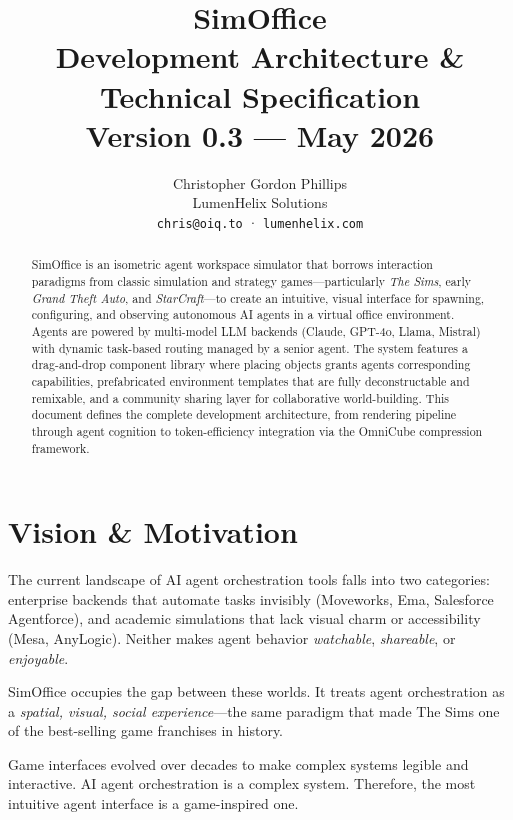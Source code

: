 \documentclass[11pt,letterpaper]{article}
\title{
  \vspace{-1cm}
  {\Huge\bfseries\textcolor{accent}{SimOffice}}\\[6pt]
  {\Large Development Architecture \& Technical Specification}\\[12pt]
  {\normalsize Version 0.3 --- May 2026}
}
\author{
  Christopher Gordon Phillips\\
  {\small LumenHelix Solutions}\\
  {\small\texttt{chris@oiq.to} · \texttt{lumenhelix.com}}
}
\date{}
\begin{document}
\maketitle
\thispagestyle{fancy}

\begin{abstract}
\noindent
SimOffice is an isometric agent workspace simulator that borrows interaction paradigms from classic simulation and strategy games---particularly \emph{The Sims}, early \emph{Grand Theft Auto}, and \emph{StarCraft}---to create an intuitive, visual interface for spawning, configuring, and observing autonomous AI agents in a virtual office environment. Agents are powered by multi-model LLM backends (Claude, GPT-4o, Llama, Mistral) with dynamic task-based routing managed by a senior agent. The system features a drag-and-drop component library where placing objects grants agents corresponding capabilities, prefabricated environment templates that are fully deconstructable and remixable, and a community sharing layer for collaborative world-building. This document defines the complete development architecture, from rendering pipeline through agent cognition to token-efficiency integration via the OmniCube compression framework.
\end{abstract}

\tableofcontents
\newpage

\section{Vision \& Motivation}

The current landscape of AI agent orchestration tools falls into two categories: enterprise backends that automate tasks invisibly (Moveworks, Ema, Salesforce Agentforce), and academic simulations that lack visual charm or accessibility (Mesa, AnyLogic). Neither makes agent behavior \emph{watchable}, \emph{shareable}, or \emph{enjoyable}.

SimOffice occupies the gap between these worlds. It treats agent orchestration as a \emph{spatial, visual, social experience}---the same paradigm that made The Sims one of the best-selling game franchises in history.

\begin{designbox}
Game interfaces evolved over decades to make complex systems legible and interactive. AI agent orchestration is a complex system. Therefore, the most intuitive agent interface is a game-inspired one.
\end{designbox}
\end{document}
